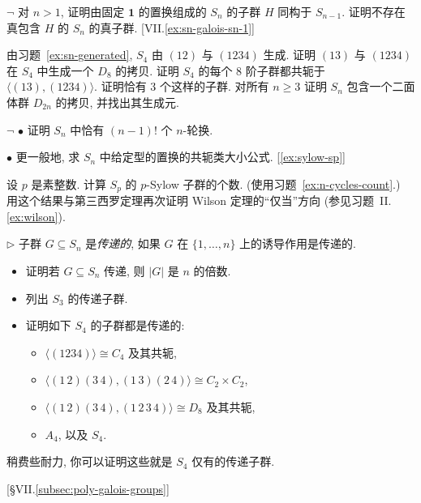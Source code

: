\begin{prob}
\label{ex:s4-dihedral}
$\neg$ 对 $n > 1$, 证明由固定 $\mathbf{1}$ 的置换组成的 $S_n$ 的子群 $H$ 同构于 $S_{n-1}$. 证明不存在真包含 $H$ 的 $S_n$ 的真子群. [VII.\ref{ex:sn-galois-sn-1}]
\end{prob}

\begin{prob}
\label{ex:s4-generated-d8}
由习题~\ref{ex:sn-generated}, $S_4$ 由 $(12)$ 与 $(1234)$ 生成. 证明 $(13)$ 与 $(1234)$ 在 $S_4$ 中生成一个 $D_8$ 的拷贝. 证明 $S_4$ 的每个 $8$ 阶子群都共轭于 $\langle (13), (1234) \rangle$. 证明恰有 $3$ 个这样的子群. 对所有 $n \geq 3$ 证明 $S_n$ 包含一个二面体群 $D_{2n}$ 的拷贝, 并找出其生成元.
\end{prob}

\begin{prob}
\label{ex:n-cycles-count}
$\neg$ $\bullet$ 证明 $S_n$ 中恰有 $(n - 1)!$ 个 $n$-轮换.

$\bullet$ 更一般地, 求 $S_n$ 中给定型的置换的共轭类大小公式. [\ref{ex:sylow-sp}]
\end{prob}

\begin{prob}
\label{ex:sylow-sp}
设 $p$ 是素整数. 计算 $S_p$ 的 $p$-Sylow 子群的个数. (使用习题~\ref{ex:n-cycles-count}.) 用这个结果与第三西罗定理再次证明 Wilson 定理的``仅当''方向 (参见习题~II.\ref{ex:wilson}).
\end{prob}

\begin{prob}
\label{ex:transitive-subgroups}
$\triangleright$ 子群 $G \subseteq S_n$ 是\emph{传递的}, 如果 $G$ 在 $\{1,\dots,n\}$ 上的诱导作用是传递的.
\begin{itemize}
\item 证明若 $G \subseteq S_n$ 传递, 则 $|G|$ 是 $n$ 的倍数.
\item 列出 $S_3$ 的传递子群.
\item 证明如下 $S_4$ 的子群都是传递的:
\begin{itemize}
\item $\langle (1234) \rangle \cong C_4$ 及其共轭,
\item $\langle (1\,2)(3\,4), (1\,3)(2\,4) \rangle \cong C_2 \times C_2$,
\item $\langle (1\,2)(3\,4), (1\,2\,3\,4) \rangle \cong D_8$ 及其共轭,
\item $A_4$, 以及 $S_4$.
\end{itemize}
\end{itemize}
稍费些耐力, 你可以证明这些就是 $S_4$ 仅有的传递子群.

[§VII.\ref{subsec:poly-galois-groups}]
\end{prob}

